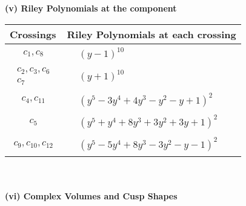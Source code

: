 \documentclass[1p]{elsarticle_modified}
\theoremstyle{definition}
\begin{document}
\newpage\renewcommand{\arraystretch}{1}
\flushleft \textbf{(v) Riley Polynomials at the component}\newline \\
\begin{tabular}{m{50pt}|m{274pt}}
Crossings & \hspace{64pt}Riley Polynomials at each crossing \\
\hline $$\begin{aligned}c_{1},c_{8}\end{aligned}$$&$\begin{aligned}
&(y-1)^{10}
\end{aligned}$\\
\hline $$\begin{aligned}c_{2},c_{3},c_{6}\\c_{7}\end{aligned}$$&$\begin{aligned}
&(y+1)^{10}
\end{aligned}$\\
\hline $$\begin{aligned}c_{4},c_{11}\end{aligned}$$&$\begin{aligned}
&(y^5-3 y^4+4 y^3- y^2- y+1)^2
\end{aligned}$\\
\hline $$\begin{aligned}c_{5}\end{aligned}$$&$\begin{aligned}
&(y^5+y^4+8 y^3+3 y^2+3 y+1)^2
\end{aligned}$\\
\hline $$\begin{aligned}c_{9},c_{10},c_{12}\end{aligned}$$&$\begin{aligned}
&(y^5-5 y^4+8 y^3-3 y^2- y-1)^2
\end{aligned}$\\
\hline
\end{tabular}\\~\\
\newpage\flushleft \textbf{(vi) Complex Volumes and Cusp Shapes}
\end{document}
